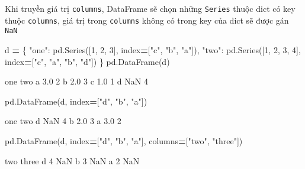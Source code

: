 \documentclass[
]{book}
\newenvironment{Shaded}{\begin{snugshade}}{\end{snugshade}}
\newcommand{\DecValTok}[1]{\textcolor[rgb]{0.00,0.00,0.81}{#1}}
\newcommand{\FloatTok}[1]{\textcolor[rgb]{0.00,0.00,0.81}{#1}}
\newcommand{\NormalTok}[1]{#1}
\newcommand{\OperatorTok}[1]{\textcolor[rgb]{0.81,0.36,0.00}{\textbf{#1}}}
\newcommand{\StringTok}[1]{\textcolor[rgb]{0.31,0.60,0.02}{#1}}
\begin{document}
Khi truyền giá trị \texttt{columns}, DataFrame sẽ chọn những \texttt{Series} thuộc dict có key thuộc \texttt{columns}, giá trị
trong \texttt{columns} không có trong key của dict sẽ được gán \texttt{NaN}

\begin{Shaded}
\begin{Highlighting}[]
\NormalTok{d }\OperatorTok{=}\NormalTok{ \{}
            \StringTok{"one"}\NormalTok{: pd.Series([}\DecValTok{1}\NormalTok{, }\DecValTok{2}\NormalTok{, }\DecValTok{3}\NormalTok{], index}\OperatorTok{=}\NormalTok{[}\StringTok{"c"}\NormalTok{, }\StringTok{"b"}\NormalTok{, }\StringTok{"a"}\NormalTok{]),}
            \StringTok{"two"}\NormalTok{: pd.Series([}\DecValTok{1}\NormalTok{, }\DecValTok{2}\NormalTok{, }\DecValTok{3}\NormalTok{, }\DecValTok{4}\NormalTok{], index}\OperatorTok{=}\NormalTok{[}\StringTok{"c"}\NormalTok{, }\StringTok{"a"}\NormalTok{, }\StringTok{"b"}\NormalTok{, }\StringTok{"d"}\NormalTok{])}
\NormalTok{        \}}
\NormalTok{pd.DataFrame(d)}
\end{Highlighting}
\end{Shaded}

\begin{Shaded}
\begin{Highlighting}[]
\NormalTok{   one  two}
\NormalTok{a  }\FloatTok{3.0}    \DecValTok{2}
\NormalTok{b  }\FloatTok{2.0}    \DecValTok{3}
\NormalTok{c  }\FloatTok{1.0}    \DecValTok{1}
\NormalTok{d  NaN    }\DecValTok{4}

\NormalTok{pd.DataFrame(d, index}\OperatorTok{=}\NormalTok{[}\StringTok{"d"}\NormalTok{, }\StringTok{"b"}\NormalTok{, }\StringTok{"a"}\NormalTok{])}
\end{Highlighting}
\end{Shaded}

\begin{Shaded}
\begin{Highlighting}[]
\NormalTok{   one  two}
\NormalTok{d  NaN    }\DecValTok{4}
\NormalTok{b  }\FloatTok{2.0}    \DecValTok{3}
\NormalTok{a  }\FloatTok{3.0}    \DecValTok{2}

\NormalTok{pd.DataFrame(d, index}\OperatorTok{=}\NormalTok{[}\StringTok{"d"}\NormalTok{, }\StringTok{"b"}\NormalTok{, }\StringTok{"a"}\NormalTok{], columns}\OperatorTok{=}\NormalTok{[}\StringTok{"two"}\NormalTok{, }\StringTok{"three"}\NormalTok{])}
\end{Highlighting}
\end{Shaded}

\begin{Shaded}
\begin{Highlighting}[]
\NormalTok{   two  three}
\NormalTok{d    }\DecValTok{4}\NormalTok{    NaN}
\NormalTok{b    }\DecValTok{3}\NormalTok{    NaN}
\NormalTok{a    }\DecValTok{2}\NormalTok{    NaN}
\end{Highlighting}
\end{Shaded}
\end{document}

